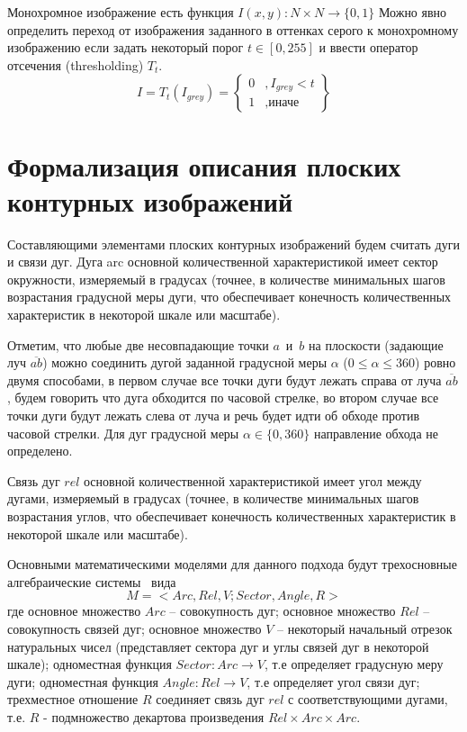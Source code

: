 Монохромное изображение есть функция $I(x,y): N \times N \to \{0,1\}$
Можно явно определить переход от изображения заданного в оттенках серого к монохромному изображению если задать некоторый порог $t\in [0,255]$ и ввести оператор отсечения (thresholding) $T_t$.
$$
I = T_t(I_{grey}) = \left\{ 
\begin{array}{ll}
0 & ,I_{grey} < t \\
1 & ,\text{иначе} 
\end{array}
\right\}
$$


\section{Формализация описания плоских контурных изображений}
Составляющими элементами плоских контурных изображений будем считать дуги и связи дуг. Дуга arc основной количественной характеристикой имеет сектор окружности, измеряемый в градусах (точнее, в количестве минимальных шагов возрастания градусной меры дуги, что обеспечивает конечность количественных характеристик в некоторой шкале или масштабе).

Отметим, что любые две несовпадающие точки $a$~и~$b$ на плоскости (задающие луч $\overline{ab}$)
можно соединить дугой заданной градусной меры $\alpha$ ($0\le\alpha\le 360$) ровно двумя способами, в первом
случае все точки дуги будут лежать справа от луча $\overline{ab}$, будем говорить что дуга обходится по часовой стрелке, во втором случае все точки дуги будут лежать слева от луча и речь будет идти об обходе против часовой стрелки. Для дуг градусной меры $\alpha \in \{0,360\}$ направление обхода не определено.

Связь дуг $rel$ основной количественной характеристикой имеет угол между дугами, измеряемый в градусах (точнее, в количестве минимальных шагов возрастания углов, что обеспечивает конечность количественных характеристик в некоторой шкале или масштабе).

Основными математическими моделями для данного подхода будут трехосновные алгебраические системы~\cite{7}\cite{8} вида
\begin{equation}
M = < Arc, Rel, V; Sector, Angle, R >
\end{equation}
где основное множество $Arc$ – совокупность дуг; основное множество $Rel$ – совокупность связей дуг; основное множество $V$ – некоторый начальный отрезок натуральных чисел (представляет сектора дуг и углы связей дуг в некоторой шкале); одноместная функция $Sector: Arc \rightarrow V$, т.е определяет градусную меру дуги; одноместная функция $Angle: Rel \rightarrow V$, т.е определяет угол связи дуг; трехместное отношение $R$ соединяет связь дуг $rel$ с соответствующими дугами, т.е. $R$ - подмножество декартова произведения 
$Rel \times Arc \times Arc.$


